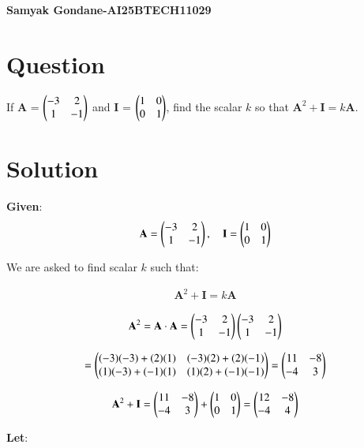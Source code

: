 \documentclass{article}
\begin{document}
\begin{center}
\large
    \textbf{Samyak Gondane-AI25BTECH11029}
\end{center}
\date{}

\section*{Question}
If $\textbf{A}$ = $\begin{pmatrix}-3 & 2 \\ 1 & -1\end{pmatrix}$ and $\textbf{I}$ = $\begin{pmatrix}1 & 0 \\ 0 & 1\end{pmatrix}$, find the scalar $k$ so that $\textbf{A}^2 + \textbf{I} = k\textbf{A}$.

\section*{Solution}

\textbf{Given}:
\begin{align}
\textbf{A} = \begin{pmatrix}-3 & 2 \\ 1 & -1\end{pmatrix}, \quad
\textbf{I} = \begin{pmatrix}1 & 0 \\ 0 & 1\end{pmatrix}
\end{align}

We are asked to find scalar $k$ such that:

\begin{align}
\textbf{A}^2 + \textbf{I} = k\textbf{A}
\end{align}



\begin{align}
\textbf{A}^2 = \textbf{A} \cdot \textbf{A} = 
\begin{pmatrix}-3 & 2 \\ 1 & -1\end{pmatrix}
\begin{pmatrix}-3 & 2 \\ 1 & -1\end{pmatrix}
\end{align}

\begin{align}
= \begin{pmatrix}(-3)(-3) + (2)(1) & (-3)(2) + (2)(-1) \\
(1)(-3) + (-1)(1) & (1)(2) + (-1)(-1)\end{pmatrix}
= \begin{pmatrix}11 & -8 \\ -4 & 3\end{pmatrix}
\end{align}

\begin{align}
\textbf{A}^2 + \textbf{I} = \begin{pmatrix}11 & -8 \\ -4 & 3\end{pmatrix} + \begin{pmatrix}1 & 0 \\ 0 & 1\end{pmatrix} = \begin{pmatrix}12 & -8 \\ -4 & 4\end{pmatrix}
\end{align}

\textbf{Let}:
\end{document}
